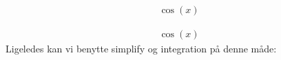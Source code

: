 \documentclass[letterpaper,10pt,english]{jupyterBook}
\begin{document}
\begin{sphinxVerbatim}[commandchars=\\\{\}]
  

\end{sphinxVerbatim}
\begin{equation*}
\begin{split}\displaystyle \cos{\left(x \right)}\end{split}
\end{equation*}
\begin{sphinxVerbatim}[commandchars=\\\{\}]
\end{sphinxVerbatim}
\begin{equation*}
\begin{split}\displaystyle \cos{\left(x \right)}\end{split}
\end{equation*}
Ligeledes kan vi benytte simplify og integration på denne måde:
\end{document}
